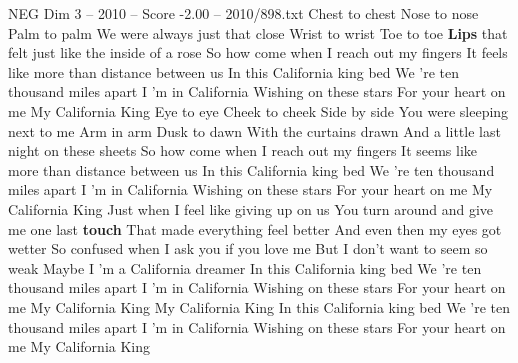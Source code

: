 \begin{textsample}{NEG Dim 3 – 2010 – Score -2.00 – 2010/898.txt}  \label{ex:f3_neg_022}
Chest to chest Nose to nose Palm to palm We were always just that close Wrist to wrist Toe to toe \textbf{Lips} that felt just like the inside of a rose So how come when I reach out my fingers It feels like more than distance between us In this California king bed We 're ten thousand miles apart I 'm in California Wishing on these stars For your heart on me My California King Eye to eye Cheek to cheek Side by side You were sleeping next to me Arm in arm Dusk to dawn With the curtains drawn And a little last night on these sheets So how come when I reach out my fingers It seems like more than distance between us In this California king bed We 're ten thousand miles apart I 'm in California Wishing on these stars For your heart on me My California King Just when I feel like giving up on us You turn around and give me one last \textbf{touch} That made everything feel better And even then my eyes got wetter So confused when I ask you if you love me But I don't want to seem so weak Maybe I 'm a California dreamer In this California king bed We 're ten thousand miles apart I 'm in California Wishing on these stars For your heart on me My California King My California King In this California king bed We 're ten thousand miles apart I 'm in California Wishing on these stars For your heart on me My California King

\end{textsample}
